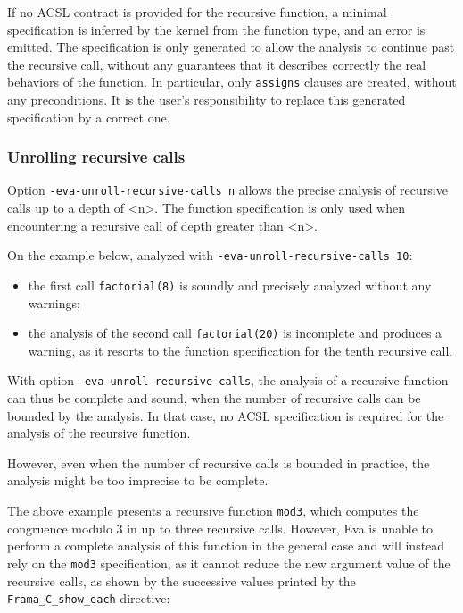 \documentclass{frama-c-book}
\begin{document}
If no ACSL contract is provided for the recursive function,
a minimal specification is inferred by the \FramaC kernel
from the function type, and an error is emitted.
The specification is only generated to allow the analysis to continue
past the recursive call, without any guarantees that it describes correctly
the real behaviors of the function.
In particular, only \lstinline|assigns| clauses are created, without any
preconditions.
It is the user's responsibility to replace this generated specification by
a correct one.

\subsubsection{Unrolling recursive calls}

Option \lstinline|-eva-unroll-recursive-calls n| allows the precise analysis
of recursive calls up to a depth of <n>. The function specification is only used
when encountering a recursive call of depth greater than <n>.

On the example below, analyzed with \lstinline|-eva-unroll-recursive-calls 10|:
\begin{itemize}
\item
  the first call \lstinline|factorial(8)| is soundly and precisely analyzed
  without any warnings;
\item
  the analysis of the second call \lstinline|factorial(20)| is incomplete and
  produces a warning, as it resorts to the function specification for the tenth
  recursive call.
\end{itemize}


With option \lstinline|-eva-unroll-recursive-calls|,
the analysis of a recursive function can thus be complete and sound,
when the number of recursive calls can be bounded by the analysis.
In that case, no ACSL specification is required for the analysis of the
recursive function.

However, even when the number of recursive calls is bounded in practice,
the \Eva{} analysis might be too imprecise to be complete.


The above example presents a recursive function \lstinline|mod3|, which
computes the congruence modulo 3 in up to three recursive calls.
However, Eva is unable to perform a complete analysis of this function
in the general case and will instead rely on the \lstinline|mod3| specification,
as it cannot reduce the new argument value of the recursive calls, as shown
by the successive values printed by the \lstinline|Frama_C_show_each| directive:
\end{document}
